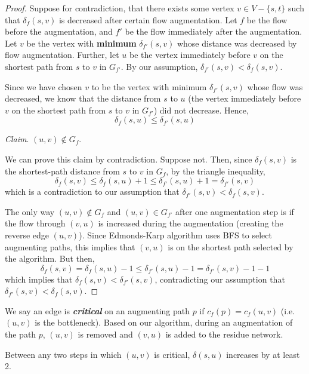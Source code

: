 \begin{proof}
    Suppose for contradiction, that there exists some vertex $v \in V-\{s,t\}$ such that $\delta_f(s,v)$ is decreased after certain flow augmentation. Let $f$ be the flow before the augmentation, and $f'$ be the flow immediately after the augmentation. Let $v$ be the vertex with \textbf{minimum} $\delta_{f'}(s,v)$ whose distance was decreased by flow augmentation. Further, let $u$ be the vertex immediately before $v$ on the shortest path from $s$ to $v$ in $G_{f'}$. By our assumption, $\delta_{f'}(s,v) < \delta_f (s,v)$.

    Since we have chosen $v$ to be the vertex with minimum $\delta_{f'}(s,v)$ whose flow was decreased, we know that the distance from $s$ to $u$ (the vertex immediately before $v$ on the shortest path from $s$ to $v$ in $G_{f'}$) did not decrease. Hence,
    $$
    \delta_{f}(s,u) \leq \delta_{f'}(s,u)
    $$

    \textit{Claim}. $(u,v) \not\in G_f$.

    We can prove this claim by contradiction. Suppose not. Then, since $\delta_{f}(s,v)$ is the shortest-path distance from $s$ to $v$ in $G_f$, by the triangle inequality,
    $$
    \delta_f (s,v) \leq \delta_f (s,u) + 1 \leq \delta_{f'}(s,u) + 1 = \delta_{f'}(s,v)
    $$
    which is a contradiction to our assumption that $\delta_{f'}(s,v) < \delta_f (s,v)$. 

    The only way $(u,v) \not\in G_f$ and $(u,v) \in G_{f'}$ after one augmentation step is if the flow through $(v,u)$ is increased during the augmentation (creating the reverse edge $(u,v)$). Since Edmonds-Karp algorithm uses BFS to select augmenting paths, this implies that $(v,u)$ is on the shortest path selected by the algorithm. But then, 
    $$
    \delta_f(s,v) = \delta_f(s,u) - 1 \leq \delta_{f'}(s,u) - 1 = \delta_{f'}(s,v) - 1 - 1
    $$
    which implies that $\delta_f(s,v) < \delta_{f'}(s,v)$, contradicting our assumption that $\delta_{f'}(s,v) < \delta_f(s,v)$.
\end{proof}

We say an edge is \textit{\textbf{critical}} on an augmenting path $p$ if $c_f(p) = c_f(u,v)$ (i.e. $(u,v)$ is the bottleneck). Based on our algorithm, during an augmentation of the path $p$, $(u,v)$ is removed and $(v,u)$ is added to the residue network.

\begin{lemma} \label{lem:edmondskarp-runtime-2}
    Between any two steps in which $(u,v)$ is critical, $\delta(s,u)$ increases by at least 2.
\end{lemma}

